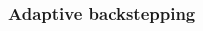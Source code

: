 %
\begin{frame}
\frametitle{Adaptive backstepping}
%
\begin{columns}
	\begin{column}{0.5\textwidth}
	\begin{figure}
	\end{figure}
	\end{column}
	\begin{column}{0.5\textwidth}
	\begin{figure}
	\end{figure}
	\end{column}
\end{columns}
\end{frame}
